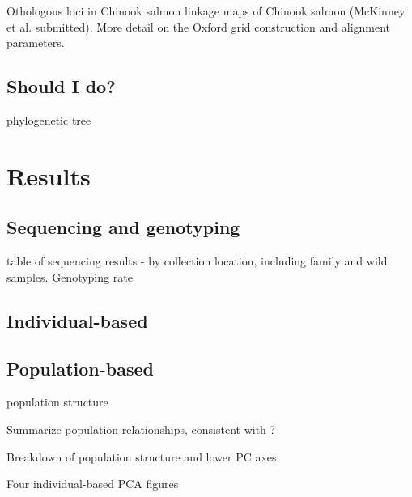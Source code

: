 \documentclass[12pt, one column]{article}
\begin{document}
Othologous loci in Chinook salmon linkage maps of Chinook salmon (McKinney et al. submitted).  More detail on the Oxford grid construction and alignment parameters.

\subsection*{Should I do?}
phylogenetic tree


\section*{Results}
\subsection*{Sequencing and genotyping}
table of sequencing results -  by collection location, including family and wild samples.
Genotyping rate

\subsection*{Individual-based}


\subsection*{Population-based}
population structure

Summarize population relationships, consistent with \citet{Small2014}?

Breakdown of population structure and lower PC axes.

Four individual-based PCA figures
\end{document}
